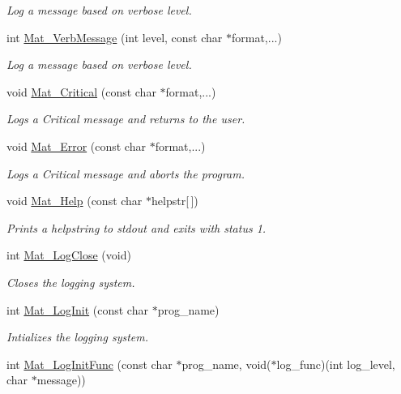 \begin{DoxyCompactItemize}
\begin{DoxyCompactList}\small\item\em Log a message based on verbose level. \end{DoxyCompactList}\item 
int \hyperlink{group__mat__util_ga64a176ea7e27e38d4242a24f3e3bad24}{Mat\-\_\-\-Verb\-Message} (int level, const char $\ast$format,...)
\begin{DoxyCompactList}\small\item\em Log a message based on verbose level. \end{DoxyCompactList}\item 
void \hyperlink{group__mat__util_gaf51f2bfbb5580f575e4dd79757e2b80c}{Mat\-\_\-\-Critical} (const char $\ast$format,...)
\begin{DoxyCompactList}\small\item\em Logs a Critical message and returns to the user. \end{DoxyCompactList}\item 
void \hyperlink{group__mat__util_ga058b1cb9a4ca36712857d2b3c4de7ffc}{Mat\-\_\-\-Error} (const char $\ast$format,...)
\begin{DoxyCompactList}\small\item\em Logs a Critical message and aborts the program. \end{DoxyCompactList}\item 
void \hyperlink{group__mat__util_gaa4039c185e807ed2e9682b66fe2ea331}{Mat\-\_\-\-Help} (const char $\ast$helpstr\mbox{[}$\,$\mbox{]})
\begin{DoxyCompactList}\small\item\em Prints a helpstring to stdout and exits with status 1. \end{DoxyCompactList}\item 
int \hyperlink{group__mat__util_ga333d15dbd2e7a691621a2af8fc7adc3d}{Mat\-\_\-\-Log\-Close} (void)
\begin{DoxyCompactList}\small\item\em Closes the logging system. \end{DoxyCompactList}\item 
int \hyperlink{group__mat__util_ga0d30e03216ceaab7c0a4ff878b26f89f}{Mat\-\_\-\-Log\-Init} (const char $\ast$prog\-\_\-name)
\begin{DoxyCompactList}\small\item\em Intializes the logging system. \end{DoxyCompactList}\item 
int \hyperlink{group__mat__util_ga93f4dd8d36413ae7f49260d757e3ab9f}{Mat\-\_\-\-Log\-Init\-Func} (const char $\ast$prog\-\_\-name, void($\ast$log\-\_\-func)(int log\-\_\-level, char $\ast$message))

\end{DoxyCompactItemize}

